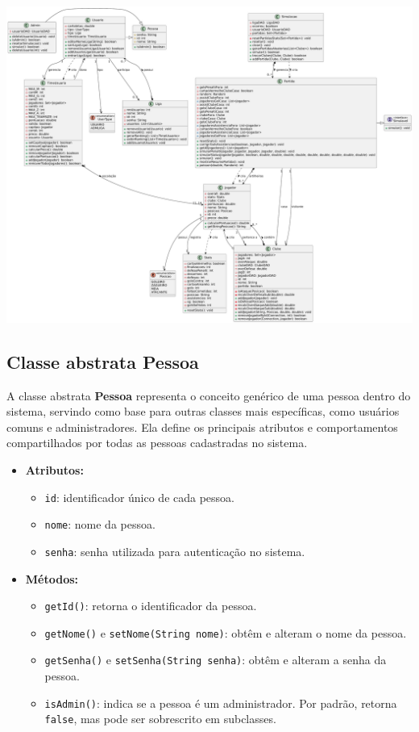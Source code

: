 \documentclass[12pt]{article}
\begin{document}
\includegraphics[width=\textwidth]{Diagrama.pdf}

\subsection{Classe abstrata Pessoa}

A classe abstrata \textbf{Pessoa} representa o conceito genérico de uma pessoa dentro do sistema, servindo como base para outras classes mais específicas, como usuários comuns e administradores. Ela define os principais atributos e comportamentos compartilhados por todas as pessoas cadastradas no sistema.

\begin{itemize}
  \item \textbf{Atributos:}
        \begin{itemize}
          \item \texttt{id}: identificador único de cada pessoa.
          \item \texttt{nome}: nome da pessoa.
          \item \texttt{senha}: senha utilizada para autenticação no sistema.
        \end{itemize}
  \item \textbf{Métodos:}
        \begin{itemize}
          \item \texttt{getId()}: retorna o identificador da pessoa.
          \item \texttt{getNome()} e \texttt{setNome(String nome)}: obtêm e alteram o nome da pessoa.
          \item \texttt{getSenha()} e \texttt{setSenha(String senha)}: obtêm e alteram a senha da pessoa.
          \item \texttt{isAdmin()}: indica se a pessoa é um administrador. Por padrão, retorna \texttt{false}, mas pode ser sobrescrito em subclasses.
        \end{itemize}
\end{itemize}
\end{document}

